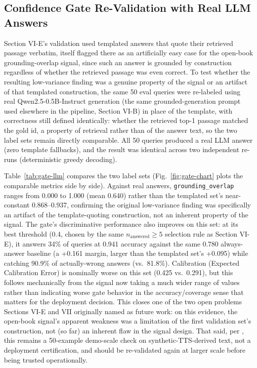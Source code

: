\documentclass[conference]{IEEEtran}
\begin{document}
\subsection{Confidence Gate Re-Validation with Real LLM Answers}
Section VI-E's validation used templated answers that quote their retrieved passage verbatim, itself flagged there as an artificially easy case for the open-book grounding-overlap signal, since such an answer is grounded by construction regardless of whether the retrieved passage was even correct. To test whether the resulting low-variance finding was a genuine property of the signal or an artifact of that templated construction, the same 50 eval queries were re-labeled using real Qwen2.5-0.5B-Instruct generation (the same grounded-generation prompt used elsewhere in the pipeline, Section VI-B) in place of the template, with correctness still defined identically: whether the retrieved top-1 passage matched the gold id, a property of retrieval rather than of the answer text, so the two label sets remain directly comparable. All 50 queries produced a real LLM answer (zero template fallbacks), and the result was identical across two independent re-runs (deterministic greedy decoding).

Table~\ref{tab:gate-llm} compares the two label sets (Fig.~\ref{fig:gate-chart} plots the comparable metrics side by side). Against real answers, \texttt{grounding\_overlap} ranges from 0.000 to 1.000 (mean 0.640) rather than the templated set's near-constant 0.868--0.937, confirming the original low-variance finding was specifically an artifact of the template-quoting construction, not an inherent property of the signal. The gate's discriminative performance also improves on this set: at its best threshold (0.4, chosen by the same $n_{\text{answered}}\geq5$ selection rule as Section VI-E), it answers 34\% of queries at 0.941 accuracy against the same 0.780 always-answer baseline (a +0.161 margin, larger than the templated set's +0.095) while catching 90.9\% of actually-wrong answers (vs.\ 81.8\%). Calibration (Expected Calibration Error) is nominally worse on this set (0.425 vs.\ 0.291), but this follows mechanically from the signal now taking a much wider range of values rather than indicating worse gate behavior in the accuracy/coverage sense that matters for the deployment decision. This closes one of the two open problems Sections VI-E and VII originally named as future work: on this evidence, the open-book signal's apparent weakness was a limitation of the first validation set's construction, not (so far) an inherent flaw in the signal design. That said, per \cite{intrygue2026}, this remains a 50-example demo-scale check on synthetic-TTS-derived text, not a deployment certification, and should be re-validated again at larger scale before being trusted operationally.
\end{document}
